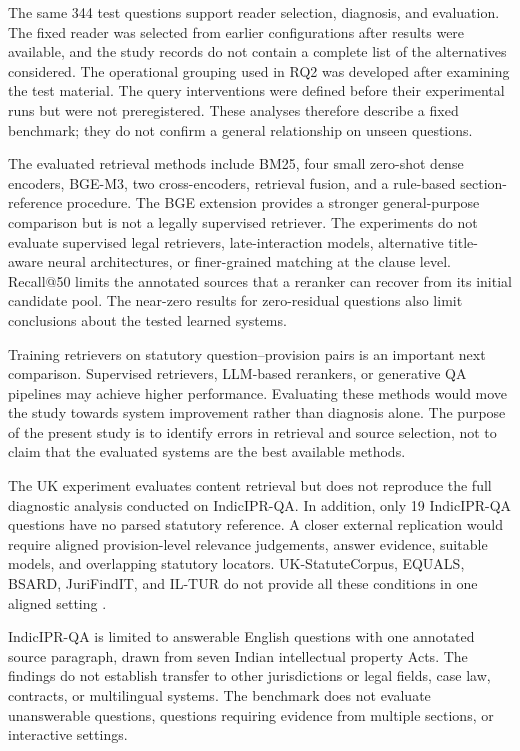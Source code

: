 \documentclass[pdflatex,sn-basic]{sn-jnl}%
\theoremstyle{thmstyleone}%
\theoremstyle{thmstyletwo}%
\theoremstyle{thmstylethree}%
\begin{document}
The same 344 test questions support reader selection, diagnosis, and
evaluation. The fixed reader was selected from earlier configurations after
results were available, and the study records do not contain a complete list
of the alternatives considered. The operational grouping used in RQ2 was
developed after examining the test material. The query interventions were
defined before their experimental runs but were not preregistered. These
analyses therefore describe a fixed benchmark; they do not confirm a general
relationship on unseen questions.

The evaluated retrieval methods include BM25, four small zero-shot dense
encoders, BGE-M3, two cross-encoders, retrieval fusion, and a rule-based
section-reference procedure. The BGE extension provides a stronger
general-purpose comparison but is not a legally supervised retriever. The
experiments do not evaluate supervised legal retrievers, late-interaction
models, alternative title-aware neural architectures, or finer-grained
matching at the clause level. Recall@50 limits the annotated sources that a
reranker can recover from its initial candidate pool. The near-zero results
for zero-residual questions also limit conclusions about the tested learned
systems.

Training retrievers on statutory question--provision pairs is an important
next comparison. Supervised retrievers, LLM-based rerankers, or generative QA
pipelines may achieve higher performance. Evaluating these methods would move
the study towards system improvement rather than diagnosis alone. The purpose
of the present study is to identify errors in retrieval and source selection,
not to claim that the evaluated systems are the best available methods.

The UK experiment evaluates content retrieval but does not reproduce the full
diagnostic analysis conducted on IndicIPR-QA. In addition, only 19
IndicIPR-QA questions have no parsed statutory reference. A closer external
replication would require aligned provision-level relevance judgements, answer
evidence, suitable models, and overlapping statutory locators.
UK-StatuteCorpus, EQUALS, BSARD, JuriFindIT, and IL-TUR do not provide all
these conditions in one aligned setting
\citep{chen2023equals,louisSpanakisBSARD2022,noceJuriFindITItalian2026,
joshiILTUR2024}.

IndicIPR-QA is limited to answerable English questions with one annotated
source paragraph, drawn from seven Indian intellectual property Acts. The
findings do not establish transfer to other jurisdictions or legal fields,
case law, contracts, or multilingual systems. The benchmark does not evaluate
unanswerable questions, questions requiring evidence from multiple sections,
or interactive settings.
\end{document}
